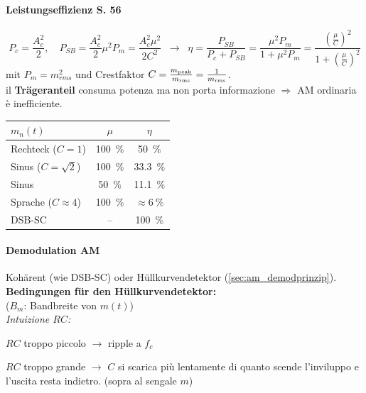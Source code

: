 \paragraph{Leistungseffizienz S. 56}
\begin{minipage}[c]{.69\linewidth}
	\begin{equation*}
		P_c = \frac{A_c^2}{2}, \quad P_{SB} = \frac{A_c^2}{2}\mu^2 P_m = \frac{A_c^2\mu^2}{2C^2} \;\;\rightarrow\;\; \eta = \frac{P_{SB}}{P_c + P_{SB}} = \frac{\mu^2P_m}{1+\mu^2P_m} = \frac{(\frac{\mu}{C})^2}{1+(\frac{\mu}{C})^2}
	\end{equation*}
	mit $P_m = m_{rms}^2$ und Crestfaktor $C = \frac{m_{\rm peak}}{m_{\rm rms}} = \frac{1}{m_{\rm rms}}$.\\
	{\color{accent}} il \textbf{Trägeranteil} consuma potenza ma non porta informazione $\Rightarrow$ AM ordinaria è inefficiente.
\end{minipage}\hfill
\begin{minipage}[c]{.29\linewidth}
	{\small\renewcommand{\arraystretch}{1.15}
	\begin{tabular}{|l|c|c|}
		\hline
		$m_n(t)$ & $\mu$ & $\eta$ \\ \hline
		Rechteck ($C=1$) & \qty{100}{\%} & \qty{50}{\%} \\
		Sinus ($C=\sqrt2$) & \qty{100}{\%} & \qty{33.3}{\%} \\
		Sinus & \qty{50}{\%} & \qty{11.1}{\%} \\
		Sprache ($C\approx4$) & \qty{100}{\%} & $\approx\qty{6}{\%}$ \\ \hline
		DSB-SC & -- & \qty{100}{\%} \\ \hline
	\end{tabular}}
\end{minipage}

\paragraph{Demodulation AM}
Kohärent (wie DSB-SC) oder Hüllkurvendetektor (\ref{sec:am_demodprinzip}). \textbf{Bedingungen für den Hüllkurvendetektor:}\\
 \qquad
{} \;($B_m$: Bandbreite von $m(t)$)\\
{\color{accent}\textit{Intuizione $RC$:}} 

$RC$ troppo piccolo $\rightarrow$ ripple a $f_c$

$RC$ troppo grande $\rightarrow$ $C$ si scarica più lentamente di quanto scende l'inviluppo e l'uscita resta indietro. (sopra al sengale $m$)

